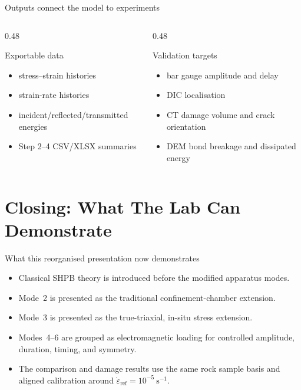 \documentclass[11pt,aspectratio=169]{beamer}
\begin{document}
\begin{frame}{Outputs connect the model to experiments}
  \begin{columns}[T,onlytextwidth]
    \begin{column}{0.48\textwidth}
      \begin{exampleblock}{Exportable data}
        \begin{itemize}
          \item stress--strain histories
          \item strain-rate histories
          \item incident/reflected/transmitted energies
          \item Step 2--4 CSV/XLSX summaries
        \end{itemize}
      \end{exampleblock}
    \end{column}
    \begin{column}{0.48\textwidth}
      \begin{block}{Validation targets}
        \begin{itemize}
          \item bar gauge amplitude and delay
          \item DIC localisation
          \item CT damage volume and crack orientation
          \item DEM bond breakage and dissipated energy
        \end{itemize}
      \end{block}
    \end{column}
  \end{columns}
\end{frame}

\section{Closing: What The Lab Can Demonstrate}

\begin{frame}{What this reorganised presentation now demonstrates}
  \begin{itemize}
    \item Classical SHPB theory is introduced before the modified apparatus modes.
    \item Mode~2 is presented as the traditional confinement-chamber extension.
    \item Mode~3 is presented as the true-triaxial, in-situ stress extension.
    \item Modes~4--6 are grouped as electromagnetic loading for controlled
          amplitude, duration, timing, and symmetry.
    \item The comparison and damage results use the same rock sample basis and
          aligned calibration around
          $\dot{\varepsilon}_{\mathrm{ref}}=10^{-5}\ \mathrm{s}^{-1}$.
  \end{itemize}
\end{frame}
\end{document}
